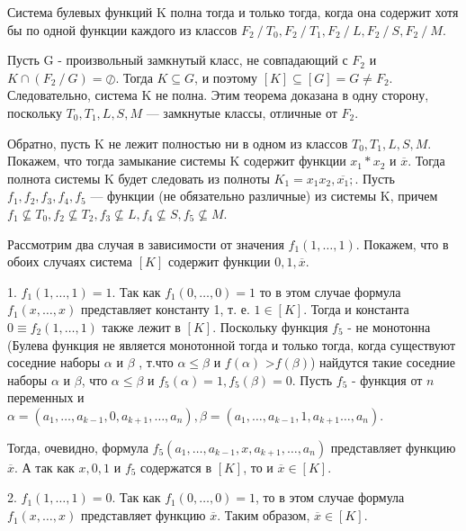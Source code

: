 \begin{proofs}[Э. Пост]
Система булевых функций K полна тогда и только тогда, когда она содержит хотя бы по одной функции каждого из классов $F_{2} \mathbin{/} T_{0}, F_{2} \mathbin{/} T_{1}, F_{2} \mathbin{/} L, F_{2} \mathbin{/} S, F_{2} \mathbin{/} M$.
	\begin{dokvo}
		Пусть G - произвольный замкнутый класс, не совпадающий с $F_{2}$ и $K \cap (F_{2}\mathbin{/} G) = \oslash$. Тогда $K \subseteq G$, и поэтому $[K] \subseteq [G] = G \neq F_{2}$.
		Следовательно, система K не полна. Этим теорема доказана в одну сторону, поскольку $T_{0}, T_{1}, L, S, M$ — замкнутые классы, отличные от $F_{2}$.

		Обратно, пусть K не лежит полностью ни в одном из классов $T_{0}, T_{1}, L, S, M$. Покажем, что тогда замыкание системы K содержит функции $x_{1} * x_{2}$ и $\overline{x}$. Тогда полнота системы K будет следовать из полноты $ K_{1} = { x_{1}x_{2}, \overline{x_{1}}};$. Пусть $f_{1}, f_{2}, f_{3}, f_{4}, f_{5}$ — функции (не обязательно различные) из системы K, причем $ f_{1} \nsubseteq T_{0}, f_{2} \nsubseteq T_{2}, f_{3} \nsubseteq L, f_{4} \nsubseteq S, f_{5} \nsubseteq M$.

		Рассмотрим два случая в зависимости от значения $f_{1} (1,\ldots , 1)$. Покажем, что в обоих случаях система $[K]$ содержит функции $0, 1, \overline{x}$.

		1. $f_{1} (1,\ldots , 1) = 1$. Так как $f_{1} (0,\ldots , 0) = 1$ то в этом случае формула $f_{1} (x,\ldots , x)$ представляет константу 1, т. е. $ 1 \in [K]$. Тогда и константа $0 \equiv f_{2} (1,\ldots , 1)$ также лежит в $[K]$.
		Поскольку функция $f_{5}$ - не монотонна (Булева функция не является монотонной тогда и только тогда, когда существуют соседние наборы $\alpha$ и $\beta$ , т.что $ \alpha \leq \beta$ и $ f(\alpha)$ \textgreater $f(\beta)$) найдутся такие соседние наборы $\alpha$ и $\beta$, что $\alpha \leq \beta$ и $f_{5}(\alpha) = 1, f_5(\beta) = 0$. Пусть $f_{5}$ - функция от $n$ переменных и $ \alpha = (a_{1}, \ldots , a_{k-1}, 0,a_{k+1},  \ldots , a_{n}),  \beta = (a_{1}, \ldots , a_{k-1}, 1, a_{k+1} \ldots , a_{n})$.

		Тогда, очевидно, формула $f_{5}(a_{1}, \ldots, a_{k-1}, x, a_{k+1}, \ldots, a_{n})$  представляет функцию $\overline{x}$.  А так как $x, 0 ,1$ и $ f_{5}$ содержатся в $[K]$, то и $\overline{x} \in [K]$.


		2.  $f_{1} (1,\ldots , 1) = 0$. Так как  $f_{1} (0,\ldots , 0) = 1$, то в этом случае формула $f_{1} (x,\ldots , x)$ представляет функцию  $\overline {x}$. Таким образом, $\overline{x} \in [K]$.


\end{dokvo}
\end{proofs}
